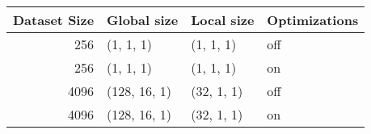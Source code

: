 \begin{tabular}{rlll}
\toprule
 Dataset Size &   Global size &  Local size & Optimizations \\
\midrule
          256 &     (1, 1, 1) &   (1, 1, 1) &           off \\
          256 &     (1, 1, 1) &   (1, 1, 1) &            on \\
         4096 &  (128, 16, 1) &  (32, 1, 1) &           off \\
         4096 &  (128, 16, 1) &  (32, 1, 1) &            on \\
\bottomrule
\end{tabular}
